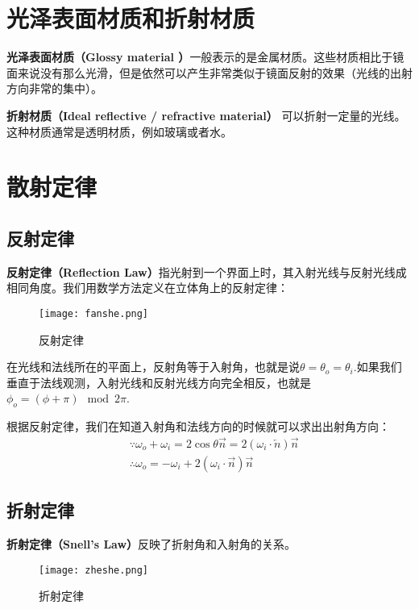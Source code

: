 \documentclass[openany]{progbookcn}
\begin{document}
\section{光泽表面材质和折射材质}

\textbf{光泽表面材质（Glossy material ）}一般表示的是金属材质。这些材质相比于镜面来说没有那么光滑，但是依然可以产生非常类似于镜面反射的效果（光线的出射方向非常的集中）。

\textbf{折射材质（Ideal reflective / refractive material）} 可以折射一定量的光线。这种材质通常是透明材质，例如玻璃或者水。

\section{散射定律}

\subsection{反射定律}

\textbf{反射定律（Reflection Law）}指光射到一个界面上时，其入射光线与反射光线成相同角度。我们用数学方法定义在立体角上的反射定律：

\begin{figure}[H]
	\centering
	\texttt{[image: fanshe.png]}
	\caption{反射定律}
	\label{fig:fanshed}
\end{figure}

在光线和法线所在的平面上，反射角等于入射角，也就是说$\theta=\theta_o=\theta_i$.如果我们垂直于法线观测，入射光线和反射光线方向完全相反，也就是$\phi_o=(\phi+\pi)\mod 2\pi$.

根据反射定律，我们在知道入射角和法线方向的时候就可以求出出射角方向：
\begin{equation}
	\begin{split}
		&\because \omega_o + \omega_i = 2\cos\theta \overrightarrow{n} = 2(\omega_i\cdot \overleftarrow{n})\overrightarrow{n}\\
		&\therefore \omega_o = -\omega_i + 2(\omega_i\cdot \overrightarrow{n})\overrightarrow{n}
	\end{split}
\end{equation}

\subsection{折射定律}

\textbf{折射定律（Snell's Law）}反映了折射角和入射角的关系。

\begin{figure}[H]
	\centering
	\texttt{[image: zheshe.png]}
	\caption{折射定律}
	\label{fig:zheshe}
\end{figure}
\end{document}
